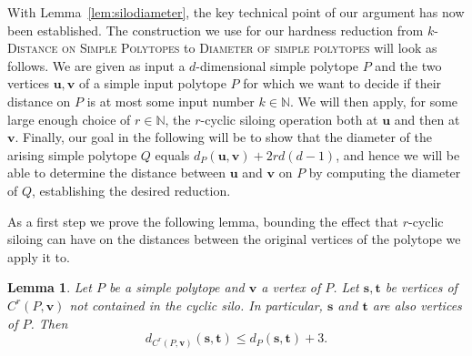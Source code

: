 \documentclass[centering,11pt,reqno]{amsart}
\newtheorem{lem}[theorem]{Lemma}
\theoremstyle{definition}
\begin{document}
With Lemma~\ref{lem:silodiameter}, the key technical point of our argument has now been established. The construction we use for our hardness reduction from \textsc{$k$-Distance on Simple Polytopes} to \textsc{Diameter of simple polytopes} will look as follows. We are given as input a $d$-dimensional simple polytope $P$ and the two vertices $\mathbf{u}, \mathbf{v}$ of a simple input polytope $P$ for which we want to decide if their distance on $P$ is at most some input number $k\in \mathbb{N}$. We will then apply, for some large enough choice of $r\in \mathbb{N}$, the $r$-cyclic siloing operation both at $\mathbf{u}$ and then at $\mathbf{v}$. Finally, our goal in the following will be to show that the diameter of the arising simple polytope $Q$ equals $d_P(\mathbf{u},\mathbf{v})+2rd(d-1)$, and hence we will be able to determine the distance between $\mathbf{u}$ and $\mathbf{v}$ on $P$ by computing the diameter of $Q$, establishing the desired reduction.

As a first step we prove the following lemma, bounding the effect that $r$-cyclic siloing can have on the distances between the original vertices of the polytope we apply it to.

\begin{lem}
\label{lem:nonsiloedvertices}
Let $P$ be a simple polytope and $\mathbf{v}$ a vertex of $P$. Let $\mathbf{s}, \mathbf{t}$ be vertices of $C^r(P,\mathbf{v})$ not contained in the cyclic silo. In particular, $\mathbf{s}$ and $\mathbf{t}$ are also vertices of $P$. Then 
\[d_{C^r(P,\mathbf{v})}(\mathbf{s},\mathbf{t}) \leq d_{P}(\mathbf{s},\mathbf{t}) + 3.\]
\end{lem}
\end{document}
